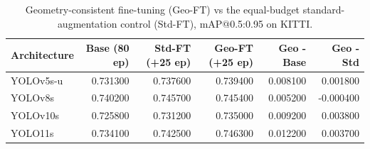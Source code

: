 \begin{table}
\caption{Geometry-consistent fine-tuning (Geo-FT) vs the equal-budget standard-augmentation control (Std-FT), mAP@0.5:0.95 on KITTI.}
\label{tab:recipe}
\begin{tabular}{lrrrrr}
\toprule
Architecture & Base (80 ep) & Std-FT (+25 ep) & Geo-FT (+25 ep) & Geo - Base & Geo - Std \\
\midrule
YOLOv5s-u & 0.731300 & 0.737600 & 0.739400 & 0.008100 & 0.001800 \\
YOLOv8s & 0.740200 & 0.745700 & 0.745400 & 0.005200 & -0.000400 \\
YOLOv10s & 0.725800 & 0.731200 & 0.735000 & 0.009200 & 0.003800 \\
YOLO11s & 0.734100 & 0.742500 & 0.746300 & 0.012200 & 0.003700 \\
\bottomrule
\end{tabular}
\end{table}
